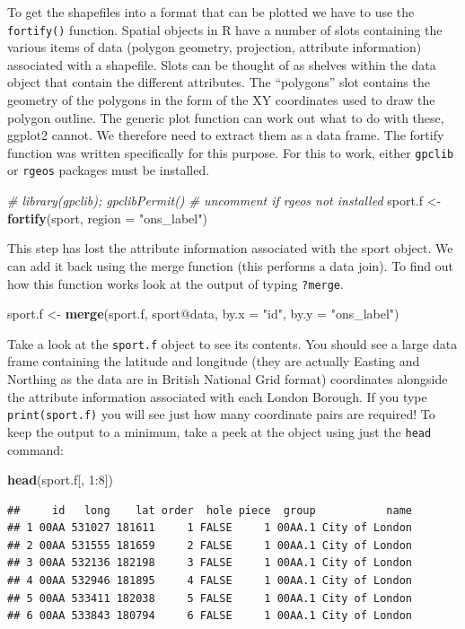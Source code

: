 \documentclass[]{article}
\newenvironment{Shaded}{}{}
\newcommand{\KeywordTok}[1]{\textcolor[rgb]{0.00,0.44,0.13}{\textbf{{#1}}}}
\newcommand{\DataTypeTok}[1]{\textcolor[rgb]{0.56,0.13,0.00}{{#1}}}
\newcommand{\DecValTok}[1]{\textcolor[rgb]{0.25,0.63,0.44}{{#1}}}
\newcommand{\StringTok}[1]{\textcolor[rgb]{0.25,0.44,0.63}{{#1}}}
\newcommand{\CommentTok}[1]{\textcolor[rgb]{0.38,0.63,0.69}{\textit{{#1}}}}
\newcommand{\NormalTok}[1]{{#1}}
\begin{document}
To get the shapefiles into a format that can be plotted we have to use
the \texttt{fortify()} function. Spatial objects in R have a number of
slots containing the various items of data (polygon geometry,
projection, attribute information) associated with a shapefile. Slots
can be thought of as shelves within the data object that contain the
different attributes. The ``polygons'' slot contains the geometry of the
polygons in the form of the XY coordinates used to draw the polygon
outline. The generic plot function can work out what to do with these,
ggplot2 cannot. We therefore need to extract them as a data frame. The
fortify function was written specifically for this purpose. For this to
work, either \texttt{gpclib} or \texttt{rgeos} packages must be
installed.

\begin{Shaded}
\begin{Highlighting}[]
\CommentTok{# library(gpclib); gpclibPermit() # uncomment if rgeos not installed}
\NormalTok{sport.f <- }\KeywordTok{fortify}\NormalTok{(sport, }\DataTypeTok{region =} \StringTok{"ons_label"}\NormalTok{)}
\end{Highlighting}
\end{Shaded}
This step has lost the attribute information associated with the sport
object. We can add it back using the merge function (this performs a
data join). To find out how this function works look at the output of
typing \texttt{?merge}.

\begin{Shaded}
\begin{Highlighting}[]
\NormalTok{sport.f <- }\KeywordTok{merge}\NormalTok{(sport.f, sport@data, }\DataTypeTok{by.x =} \StringTok{"id"}\NormalTok{, }\DataTypeTok{by.y =} \StringTok{"ons_label"}\NormalTok{)}
\end{Highlighting}
\end{Shaded}
Take a look at the \texttt{sport.f} object to see its contents. You
should see a large data frame containing the latitude and longitude
(they are actually Easting and Northing as the data are in British
National Grid format) coordinates alongside the attribute information
associated with each London Borough. If you type \texttt{print(sport.f)}
you will see just how many coordinate pairs are required! To keep the
output to a minimum, take a peek at the object using just the
\texttt{head} command:

\begin{Shaded}
\begin{Highlighting}[]
\KeywordTok{head}\NormalTok{(sport.f[, }\DecValTok{1}\NormalTok{:}\DecValTok{8}\NormalTok{])}
\end{Highlighting}
\end{Shaded}
\begin{verbatim}
##     id   long    lat order  hole piece  group           name
## 1 00AA 531027 181611     1 FALSE     1 00AA.1 City of London
## 2 00AA 531555 181659     2 FALSE     1 00AA.1 City of London
## 3 00AA 532136 182198     3 FALSE     1 00AA.1 City of London
## 4 00AA 532946 181895     4 FALSE     1 00AA.1 City of London
## 5 00AA 533411 182038     5 FALSE     1 00AA.1 City of London
## 6 00AA 533843 180794     6 FALSE     1 00AA.1 City of London
\end{verbatim}
\end{document}
